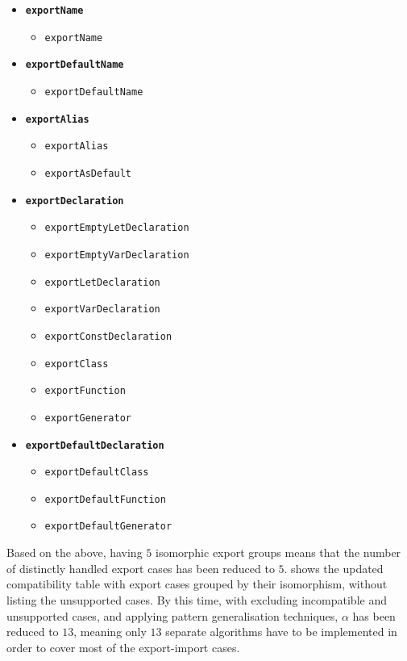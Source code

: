 \begin{itemize}
\item \textbf{\lstinline{exportName}}
	\begin{itemize}
	\item \lstinline{exportName}
	\end{itemize}

\item \textbf{\lstinline{exportDefaultName}}
	\begin{itemize}
	\item \lstinline{exportDefaultName}
	\end{itemize}

\item \textbf{\lstinline{exportAlias}}
	\begin{itemize}
	\item \lstinline{exportAlias}
	\item \lstinline{exportAsDefault}
	\end{itemize}

\item \textbf{\lstinline{exportDeclaration}}
	\begin{itemize}
	\item \lstinline{exportEmptyLetDeclaration}
	\item \lstinline{exportEmptyVarDeclaration}
	\item \lstinline{exportLetDeclaration}
	\item \lstinline{exportVarDeclaration}
	\item \lstinline{exportConstDeclaration}
	\item \lstinline{exportClass}
	\item \lstinline{exportFunction}
	\item \lstinline{exportGenerator}
	\end{itemize}

\item \textbf{\lstinline{exportDefaultDeclaration}}
	\begin{itemize}
	\item \lstinline{exportDefaultClass}
	\item \lstinline{exportDefaultFunction}
	\item \lstinline{exportDefaultGenerator}
	\end{itemize}
\end{itemize}

Based on the above, having $5$ isomorphic export groups means that the number of distinctly handled export cases has been reduced to $5$.  shows the updated compatibility table with export cases grouped by their isomorphism, without listing the unsupported cases. By this time, with excluding incompatible and unsupported cases, and applying pattern generalisation techniques, $\alpha$ has been reduced to $13$, meaning only $13$ separate algorithms have to be implemented in order to cover most of the export-import cases.

